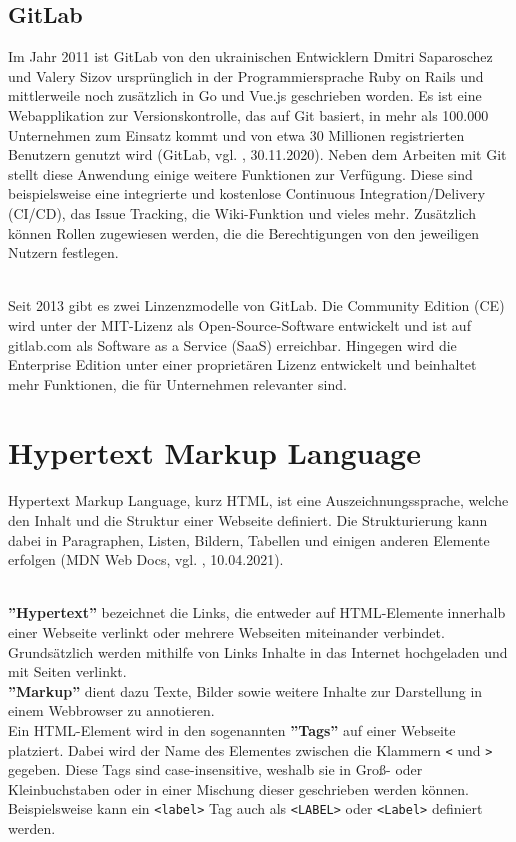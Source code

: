 \subsection{GitLab}
Im Jahr 2011 ist GitLab von den ukrainischen Entwicklern Dmitri Saparoschez und Valery Sizov ursprünglich in der Programmiersprache Ruby on Rails und mittlerweile noch zusätzlich in Go und Vue.js geschrieben worden. Es ist eine Webapplikation zur Versionskontrolle, das auf Git basiert, in mehr als 100.000 Unternehmen zum Einsatz kommt und von etwa 30 Millionen registrierten Benutzern genutzt wird (GitLab, vgl. \cite{gitlab_2020}, 30.11.2020). Neben dem Arbeiten mit Git stellt diese Anwendung einige weitere Funktionen zur Verfügung. Diese sind beispielsweise eine integrierte und kostenlose Continuous Integration/Delivery (CI/CD), das Issue Tracking, die Wiki-Funktion und vieles mehr. Zusätzlich können Rollen zugewiesen werden, die die Berechtigungen von den jeweiligen Nutzern festlegen.

\mbox{}\\Seit 2013 gibt es zwei Linzenzmodelle von GitLab. Die Community Edition (CE) wird unter der MIT-Lizenz als Open-Source-Software entwickelt und ist auf gitlab.com als Software as a Service (SaaS) erreichbar. Hingegen wird die Enterprise Edition unter einer proprietären Lizenz entwickelt und beinhaltet mehr Funktionen, die für Unternehmen relevanter sind.

\section{Hypertext Markup Language}
Hypertext Markup Language, kurz HTML, ist eine Auszeichnungssprache, welche den Inhalt und die Struktur einer Webseite definiert. Die Strukturierung kann dabei in Paragraphen, Listen, Bildern, Tabellen und einigen anderen Elemente erfolgen (MDN Web Docs, vgl. \cite{html_2021}, 10.04.2021). 

\mbox{}\\
\textbf{''Hypertext''} bezeichnet die Links, die entweder auf HTML-Elemente innerhalb einer Webseite verlinkt oder mehrere Webseiten miteinander verbindet. Grundsätzlich werden mithilfe von Links Inhalte in das Internet hochgeladen und mit Seiten verlinkt.\\
\textbf{''Markup''} dient dazu Texte, Bilder sowie weitere Inhalte zur Darstellung in einem Webbrowser zu annotieren.\\
Ein HTML-Element wird in den sogenannten \textbf{''Tags''} auf einer Webseite platziert. Dabei wird der Name des Elementes zwischen die Klammern \texttt{<} und \texttt{>} gegeben. Diese Tags sind case-insensitive, weshalb sie in Groß- oder Kleinbuchstaben oder in einer Mischung dieser geschrieben werden können. Beispielsweise kann ein \texttt{<label>} Tag auch als \texttt{<LABEL>} oder \texttt{<Label>} definiert werden.

